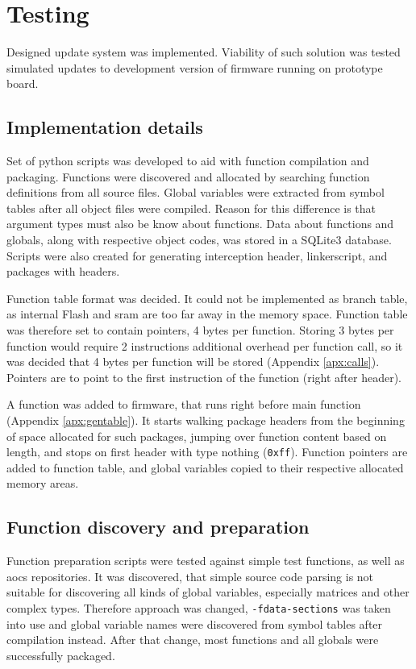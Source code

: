\newpage
\section{Testing}

Designed update system was implemented. Viability of such solution was tested simulated updates to development version of firmware running on prototype board.

\subsection{Implementation details}

Set of python scripts was developed to aid with function compilation and packaging. Functions were discovered and allocated by searching function definitions from all source files. Global variables were extracted from symbol tables after all object files were compiled. Reason for this difference is that argument types must also be know about functions. Data about functions and globals, along with respective object codes, was stored in a SQLite3 database. Scripts were also created for generating interception header, linkerscript, and packages with headers.

Function table format was decided. It could not be implemented as branch table, as internal Flash and \gls{sram} are too far away in the memory space. Function table was therefore set to contain pointers, 4 bytes per function. Storing 3 bytes per function would require 2 instructions additional overhead per function call, so it was decided that 4 bytes per function will be stored (Appendix \ref{apx:calls}). Pointers are to point to the first instruction of the function (right after header).

A function was added to firmware, that runs right before main function (Appendix \ref{apx:gentable}). It starts walking package headers from the beginning of space allocated for such packages, jumping over function content based on length, and stops on first header with type nothing (\texttt{0xff}). Function pointers are added to function table, and global variables copied to their respective allocated memory areas.

\subsection{Function discovery and preparation}

Function preparation scripts were tested against simple test functions, as well as \gls{aocs} repositories. It was discovered, that simple source code parsing is not suitable for discovering all kinds of global variables, especially matrices and other complex types. Therefore approach was changed, \texttt{-fdata-sections} was taken into use and global variable names were discovered from symbol tables after compilation instead. After that change, most functions and all globals were successfully packaged.

